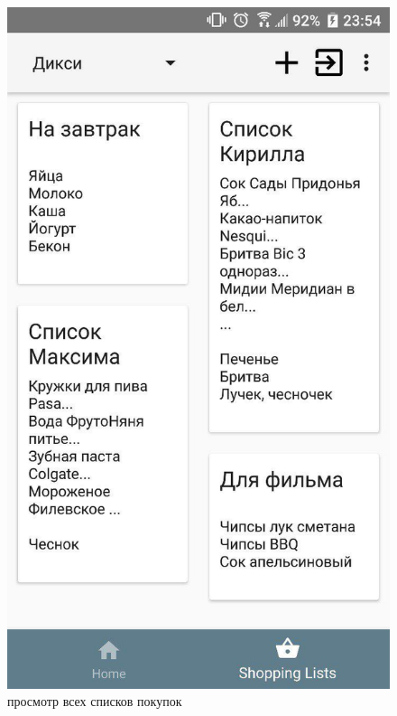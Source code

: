 \begin{figure}[h!]
    \centering
    \includegraphics[height=0.38\textheight]{./screenshots/3/all_shoplists.jpg}
    \caption{\small{просмотр всех списков покупок}}
    \label{sl_all}
    \endminipage\hfill

\end{figure}
